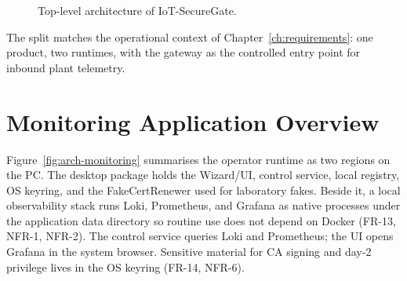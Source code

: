\documentclass[12pt,a4paper]{report}
\begin{document}
\begin{figure}[htbp]
{%
}
\caption{Top-level architecture of IoT-SecureGate.}
\label{fig:arch-toplevel}
\end{figure}

The split matches the operational context of
Chapter~\ref{ch:requirements}: one product, two runtimes,
with the gateway as the controlled entry point for inbound
plant telemetry.

\section{Monitoring Application Overview}
\label{sec:arch-monitoring-overview}

Figure~\ref{fig:arch-monitoring} summarises the operator
runtime as two regions on the PC. The desktop package
holds the Wizard/UI, control service, local registry,
OS keyring, and the FakeCertRenewer used for laboratory
fakes. Beside it, a local observability stack runs Loki,
Prometheus, and Grafana as native processes under the
application data directory so routine use does not depend
on Docker (FR-13, NFR-1, NFR-2). The control service
queries Loki and Prometheus; the UI opens Grafana in the
system browser. Sensitive material for CA signing and
day-2 privilege lives in the OS keyring (FR-14, NFR-6).
\end{document}
